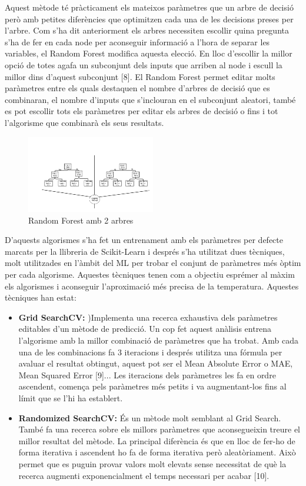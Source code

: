 \documentclass[10pt,a4paper,twocolumn,twoside]{article}
\begin{document}
\begin{itemize}
Aquest mètode té pràcticament els mateixos paràmetres que un arbre de decisió però amb petites diferències que optimitzen cada una de les decisions preses per l'arbre. Com s'ha dit anteriorment els arbres necessiten escollir quina pregunta s'ha de fer en cada node per aconseguir informació a l'hora de separar les variables, el Random Forest modifica aquesta elecció. En lloc d'escollir la millor opció de totes agafa un subconjunt dels inputs que arriben al node i escull la millor dins d'aquest subconjunt [8]. El Random Forest permet editar molts paràmetres entre els quals destaquen el nombre d'arbres de decisió que es combinaran, el nombre d'inputs que s'inclouran en el subconjunt aleatori, també es pot escollir tots els paràmetres per editar els arbres de decisió o fins i tot l'algorisme que combinarà els seus resultats.
\begin{figure}[!h]
\centering
	\includegraphics[width=0.5\textwidth]{../img/randomForest}
	\caption{Random Forest amb 2 arbres}
	\label{fig-RandomForest}
\end{figure}
\end{itemize}
D'aquests algorismes s'ha fet un entrenament amb els paràmetres per defecte marcats per la llibreria de Scikit-Learn i després s'ha utilitzat dues tècniques, molt utilitzades en l'àmbit del ML per trobar el conjunt de paràmetres més òptim per cada algorisme. Aquestes tècniques tenen com a objectiu esprémer al màxim els algorismes i aconseguir l'aproximació més precisa de la temperatura. Aquestes tècniques han estat:
 \begin{itemize}
\item \textbf{Grid SearchCV:} )Implementa una recerca exhaustiva dels paràmetres editables d'un mètode de predicció. Un cop fet aquest anàlisis entrena l'algorisme amb la millor combinació de paràmetres que ha trobat. Amb cada una de les combinacions fa 3 iteracions i després utilitza una fórmula per avaluar el resultat obtingut, aquest pot ser el Mean Absolute Error o MAE, Mean Squared Error [9]... Les iteracions dels paràmetres les fa en ordre ascendent, comença pels paràmetres més petits i va augmentant-los fins al límit que se l'hi ha establert.
\item \textbf{Randomized SearchCV:} És un mètode molt semblant al Grid Search. També fa una recerca sobre els millors paràmetres que aconsegueixin treure el millor resultat del mètode. La principal diferència és que en lloc de fer-ho de forma iterativa i ascendent ho fa de forma iterativa però aleatòriament. Això permet que es puguin provar valors molt elevats sense necessitat de què la recerca augmenti exponencialment el temps necessari per acabar [10].
\end{itemize}
\end{document}
